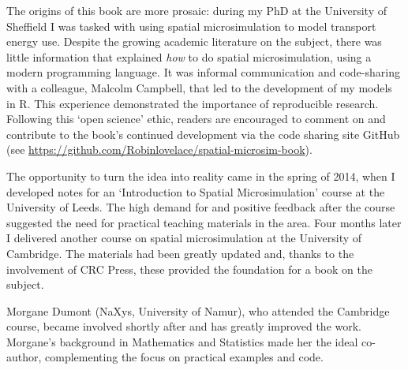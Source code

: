 The origins of this book are more prosaic: during my PhD at the University of Sheffield
I was tasked with using spatial microsimulation to model transport energy use.
Despite the growing academic literature on the subject,
there was little information that explained \emph{how} to do spatial microsimulation,
using a modern programming language.
It was informal communication and code-sharing with a colleague,
Malcolm Campbell, that led to the development of my models in R.
This experience demonstrated the importance of
reproducible research. Following this `open science' ethic,
readers are encouraged to comment on and contribute to
the book's continued development via the code sharing site GitHub
(see \url{https://github.com/Robinlovelace/spatial-microsim-book}).

The opportunity to turn the idea into reality came in the spring
of 2014, when I developed notes for an `Introduction to Spatial Microsimulation' course at
the University of Leeds.
The high demand for and positive feedback after the course
suggested the need for practical teaching materials in the area.
Four months later
I delivered another course on spatial microsimulation
at the University of Cambridge.
The materials had been greatly updated
and, thanks to the involvement of CRC Press, these
provided the foundation for a book on the subject.

Morgane Dumont (NaXys, University of Namur), who attended the Cambridge course,
became involved shortly after and has greatly improved the work.
Morgane's background in Mathematics and Statistics made her the
ideal co-author, complementing the focus on practical examples
and code.


